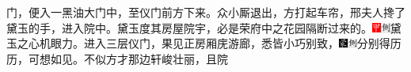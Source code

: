 门，便入一黑油大门中，至仪门前方下来。众小厮退出，方打起车帘，邢夫人搀了黛玉的手，进入院中。黛玉度其房屋院宇，必是荣府中之花园隔断过来的。{\includegraphics[width=3mm]{../Images/00002}\includegraphics[width=3mm]{../Images/00011}\footnotesize \kaishu 黛玉之心机眼力。}进入三层仪门，果见正房厢庑游廊，悉皆小巧别致，{\includegraphics[width=3mm]{../Images/00006}\includegraphics[width=3mm]{../Images/00011}\footnotesize \kaishu 分别得历历，可想如见。}不似方才那边轩峻壮丽，且院